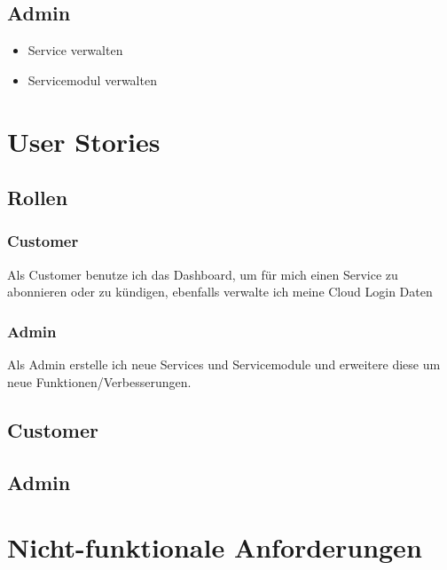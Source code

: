 \subsection{Admin}
\begin{itemize}
  \item Service verwalten
  \item Servicemodul verwalten
\end{itemize}
\section{User Stories}
\subsection{Rollen}
\subsubsection{Customer}
Als Customer benutze ich das Dashboard, um für mich einen Service zu abonnieren oder zu 
kündigen, ebenfalls verwalte ich meine Cloud Login Daten
\subsubsection{Admin}
Als Admin erstelle ich neue Services und Servicemodule und erweitere diese um 
neue Funktionen/Verbesserungen.
\subsection{Customer}





 
  
 \subsection{Admin}
 
 
 
 

\newpage

\section{Nicht-funktionale Anforderungen}



